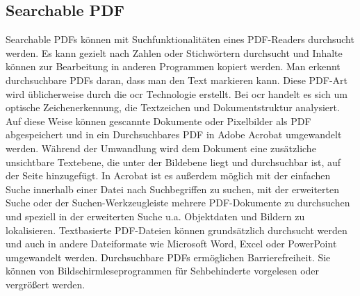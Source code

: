 \subsection{Searchable PDF}
Searchable PDFs können mit Suchfunktionalitäten eines PDF-Readers durchsucht werden. Es kann gezielt nach Zahlen oder Stichwörtern durchsucht und Inhalte können zur Bearbeitung in anderen Programmen kopiert werden. Man erkennt durchsuchbare PDFs daran, dass man den Text markieren kann. Diese PDF-Art wird üblicherweise durch die \gls{ocr} Technologie erstellt. Bei \gls{ocr} handelt es sich um optische Zeichenerkennung, die Textzeichen und Dokumentstruktur analysiert. Auf diese Weise können gescannte Dokumente oder Pixelbilder als PDF abgespeichert und in ein Durchsuchbares PDF in Adobe Acrobat umgewandelt werden. Während der Umwandlung wird dem Dokument eine zusätzliche unsichtbare Textebene, die unter der Bildebene liegt und durchsuchbar ist, auf der Seite hinzugefügt. In Acrobat ist es außerdem möglich mit der einfachen Suche innerhalb einer Datei nach Suchbegriffen zu suchen, mit der erweiterten Suche oder der Suchen-Werkzeugleiste mehrere PDF-Dokumente zu durchsuchen und speziell in der erweiterten Suche u.a. Objektdaten und Bildern zu lokalisieren. Textbasierte PDF-Dateien können grundsätzlich durchsucht werden und auch in andere Dateiformate wie Microsoft Word, Excel oder PowerPoint umgewandelt werden. Durchsuchbare PDFs ermöglichen Barrierefreiheit. Sie können von Bildschirmleseprogrammen für Sehbehinderte vorgelesen oder vergrößert werden. 
\cite{adobe-search}




